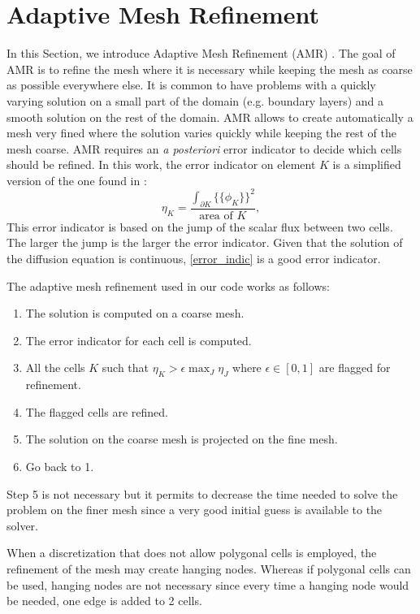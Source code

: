 \documentclass[preprint,10pt]{elsarticle}
\newcommand\ldb{\{\!\!\{}
\newcommand\rdb{\}\!\!\}}
\renewcommand{\(}{\left(}
\renewcommand{\)}{\right)}
\renewcommand{\[}{\left[}
\renewcommand{\]}{\right]}
\begin{document}
\section{Adaptive Mesh Refinement} \label{sec_amr}
In this Section, we introduce Adaptive Mesh Refinement (AMR)
\cite{Jessee1998,Wang2010a,Ragusa2010}. The goal of AMR is to refine the mesh
where it is necessary while keeping the mesh as coarse as possible everywhere
else. It is common to have problems with a quickly varying solution on a small
part of the domain (e.g. boundary layers) and a smooth solution on the rest of 
the domain. AMR allows to create automatically a mesh very fined where the
solution varies quickly while keeping the rest of the mesh coarse. AMR requires 
an \emph{a posteriori} error indicator to decide which cells should be refined. 
In this work, the error indicator on element $K$ is a simplified version of
the one found in \cite{Wang2010a}:
\begin{equation}
  \eta_K = \frac{\int_{\partial K} \ldb\phi_K\rdb^2}{\textrm{area of }K},
  \label{error_indic}
\end{equation}  
This error indicator is based on the jump of the scalar flux between
two cells. The larger the jump is the larger the error indicator. Given that
the solution of the diffusion equation is continuous, \cref{error_indic} is a
good error indicator. 

The adaptive mesh refinement used in our code works as follows:
\begin{enumerate}
  \item The solution is computed on a coarse mesh.
  \item The error indicator for each cell is computed.
  \item All the cells $K$ such that $\eta_K > \epsilon \max_{J} \eta_J$ where
    $\epsilon \in [0,1]$ are flagged for refinement.
  \item The flagged cells are refined.
  \item The solution on the coarse mesh is projected on the fine mesh.
  \item Go back to 1.
\end{enumerate}
Step 5 is not necessary but it permits to decrease the time needed to solve
the problem on the finer mesh since a very good initial guess is available to
the solver.

When a discretization that does not allow polygonal cells is employed, the
refinement of the mesh may create hanging nodes. Whereas if polygonal cells can
be used, hanging nodes are not necessary since every time a hanging node
would be needed, one edge is added to 2 cells.
\end{document}
